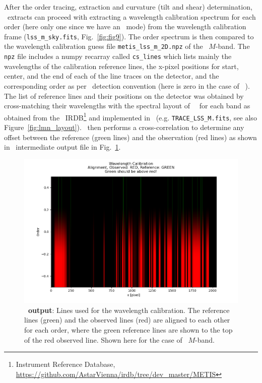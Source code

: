 After the order tracing, extraction and curvature (tilt and shear) determination, \pyred~extracts can proceed with extracting a wavelength calibration spectrum for each order (here only one since we have an \lss~mode) from the wavelength calibration frame (\texttt{lss\_m\_sky.fits}, Fig.~\ref{fig:fig9}). The order spectrum is then compared to the wavelength calibration guess file \texttt{metis\_lss\_m\_2D.npz} of the \lss~$M$-band.  The \texttt{npz} file includes a numpy recarray called \texttt{cs\_lines} which lists mainly the wavelengths of the calibration reference lines, the x-pixel positions for start, center, and the end of each of the line traces on the detector, and the corresponding order as per \pyred~detection convention (here is zero in the case of \met~\lss). The list of reference lines and their positions on the detector was obtained by cross-matching their wavelengths  with the spectral layout of \met~\lss~for each band as obtained from the \met~IRDB\footnote{Instrument Reference Database, \url{https://github.com/AstarVienna/irdb/tree/dev_master/METIS}} and implemented in \scope~(e.g. \texttt{TRACE\_LSS\_M.fits}, see also Figure~\ref{fig:lmn_layout}). \pyred~then performs a cross-correlation to determine any offset between the reference (green lines) and the observation (red lines) as shown in \pyred~intermediate output file in Fig.~\ref{fig:fig10}.
\begin{figure}[!h]
  \centering
  \includegraphics[width=\textwidth]{figures/LSS_CrtAlg_files/Figure_13.png}
  \caption{\textbf{\pyred~output}: Lines used for the wavelength calibration. The reference lines (green) and the observed lines (red) are aligned to each other for each order, where the green reference lines are shown to the top of the red observed line.  Shown here for the case of \lss~$M$-band.}
  \label{fig:fig10}
\end{figure}

